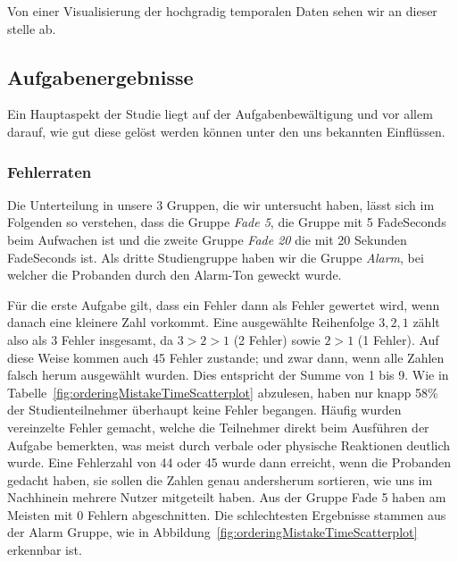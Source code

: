 Von einer Visualisierung der hochgradig temporalen Daten sehen wir an dieser stelle ab.

\subsection{Aufgabenergebnisse} 

Ein Hauptaspekt der Studie liegt auf der Aufgabenbewältigung und vor allem darauf, wie gut diese gelöst werden können unter den uns bekannten Einflüssen. 

\subsubsection{Fehlerraten}

Die Unterteilung in unsere 3 Gruppen, die wir untersucht haben, lässt sich im Folgenden so verstehen, dass die Gruppe \textit{Fade 5}, die Gruppe mit 5 FadeSeconds beim Aufwachen ist und die zweite Gruppe \textit{Fade 20} die mit 20 Sekunden FadeSeconds ist. Als dritte Studiengruppe haben wir die Gruppe \textit{Alarm}, bei welcher die Probanden durch den Alarm-Ton geweckt wurde.

Für die erste Aufgabe gilt, dass ein Fehler dann als Fehler gewertet wird, wenn danach eine kleinere Zahl vorkommt. Eine ausgewählte Reihenfolge $3, 2, 1$ zählt also als 3 Fehler insgesamt, da $3 > 2 > 1$ (2 Fehler) sowie $2 > 1$ (1 Fehler). Auf diese Weise kommen auch 45 Fehler zustande; und zwar dann, wenn alle Zahlen falsch herum ausgewählt wurden. Dies entspricht der Summe von 1 bis 9.
Wie in Tabelle~\ref{fig:orderingMistakeTimeScatterplot} abzulesen, haben nur knapp 58\% der Studienteilnehmer überhaupt keine Fehler begangen. Häufig wurden vereinzelte Fehler gemacht, welche die Teilnehmer direkt beim Ausführen der Aufgabe bemerkten, was meist durch verbale oder physische Reaktionen deutlich wurde. 
Eine Fehlerzahl von 44 oder 45 wurde dann erreicht, wenn die Probanden gedacht haben, sie sollen die Zahlen genau andersherum sortieren, wie uns im Nachhinein mehrere Nutzer mitgeteilt haben.
Aus der Gruppe Fade 5 haben am Meisten mit 0 Fehlern abgeschnitten. Die schlechtesten Ergebnisse stammen aus der Alarm Gruppe, wie in Abbildung~\ref{fig:orderingMistakeTimeScatterplot} erkennbar ist.


